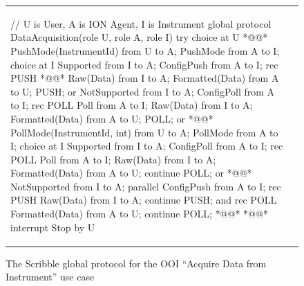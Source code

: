 \documentclass{article}
\begin{document}

\begin{figure}[p]
\centering

\begin{tabular}{ll}
\begin{minipage}{9cm}
{\lstset{numbers=left}
\begin{SJLISTING}
// U is User, A is ION Agent, I is Instrument
global protocol DataAcquisition(role U, role A, role I) {
	try {		choice at U { *@\label{line:userchoiceopen}@*
						PushMode(InstrumentId) from U to A;
						PushMode from A to I;
						choice at I {
							Supported from I to A;
							ConfigPush from A to I;
							rec PUSH { *@\label{line:firstrecursion}@*
								Raw(Data) from I to A;
								Formatted(Data) from A to U;
								PUSH;
							}
						} or {
							NotSupported from I to A;
							ConfigPoll from A to I;
							rec POLL {
								Poll from A to I;
								Raw(Data) from I to A;
								Formatted(Data) from A to U;
								POLL;
						}	}
					} or { *@\label{line:userchoiceor}@*
						PollMode(InstrumentId, int) from U to A;
						PollMode from A to I;
						choice at I {
							Supported from I to A;
							ConfigPoll from A to I;
							rec POLL {
								Poll from A to I;
								Raw(Data) from I to A;
								Formatted(Data) from A to U;
								continue POLL;
							}
						} or { *@\label{line:pollnotsupportedopen}@*
							NotSupported from I to A;
							parallel {
								ConfigPush from A to I;
								rec PUSH {
									Raw(Data) from I to A;
									continue PUSH;
								}
							} and {
								rec POLL {
									Formatted(Data) from A to U;
									continue POLL;	}
						}	} *@\label{line:pollnotsupportedclose}@*
					} *@\label{line:userchoiceclose}@*
	} interrupt {
		Stop by U
}	}
\end{SJLISTING}}
\end{minipage}
&
\end{tabular}
\caption{The Scribble global protocol for the OOI ``Acquire Data from Instrument'' use case\label{fig:ooi_example2}}
\end{figure}
\end{document}
